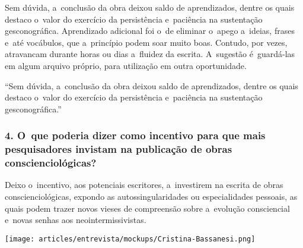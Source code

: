 \documentclass{gescons}
\begin{document}
\begin{multicols}{2}
Sem dúvida, a~conclusão da obra deixou saldo de aprendizados, dentre os quais destaco o~valor do exercício da persistência e~paciência na sustentação gesconográfica. Aprendizado adicional foi o~de eliminar o~apego a~ideias, frases e~até vocábulos, que a~princípio podem soar muito boas. Contudo, por vezes, atravancam durante horas ou dias a~fluidez da escrita. A~sugestão é~guardá-las em algum arquivo próprio, para utilização em outra oportunidade. 

\begin{pullquote}
``Sem dúvida, a~conclusão da obra deixou saldo de aprendizados, dentre os quais destaco o~valor do exercício da persistência e~paciência na sustentação gesconográfica.''
\end{pullquote}

\subsubsection{4. O~que poderia dizer como incentivo para que mais pesquisadores invistam na publicação de obras conscienciológicas?}

Deixo o~incentivo, aos potenciais escritores, a~investirem na escrita de obras conscienciológicas, expondo as autossingularidades ou especialidades pessoais, as quais podem trazer novos vieses de compreensão sobre a~evolução consciencial e~novas senhas aos neointermissivistas. 


\begin{center}
    \texttt{[image: articles/entrevista/mockups/Cristina-Bassanesi.png]}
\end{center}
    
    \end{multicols}
\end{document}
